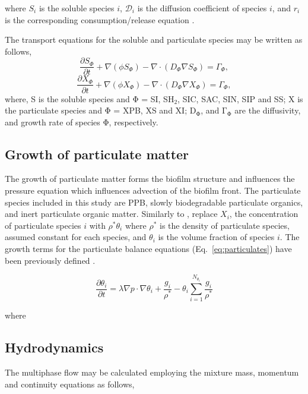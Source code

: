 where $S_i$ is the soluble species $i$, $\mathcal{D}_i$ is the diffusion coefficient of species $i$, and $r_i$ is the corresponding consumption/release equation \cite{Puyol2017}.

The transport equations for the soluble and particulate species may be written as follows,
\begin{equation}
\label{eq:solublesD}
\frac{\partial S_{\Phi}}{\partial t} + \nabla (\phi S_{\Phi}) - \nabla \cdot (D_{\Phi} \nabla S_{\Phi}) = \Gamma_{\Phi}, 
\end{equation}
\begin{equation}
\label{eq:particulate}
\frac{\partial X_{\Phi}}{\partial t} + \nabla (\phi X_{\Phi}) - \nabla \cdot (D_{\Phi} \nabla X_{\Phi}) = \Gamma_{\Phi}, 
\end{equation}
where, S is the soluble species and $\mathrm{\Phi}$ = SI, SH$\mathrm{_2}$, SIC, SAC, SIN, SIP and SS; X is the particulate species and $\mathrm{\Phi}$ = XPB, XS and XI; $\mathrm{D_{\Phi}}$, and $\mathrm{\Gamma_{\Phi}}$ are the diffusivity, and growth rate of species $\mathrm{\Phi}$, respectively.  


\subsection{Growth of particulate matter}
The growth of particulate matter forms the biofilm structure and influences the pressure equation which influences advection of the biofilm front. The particulate species included in this study are PPB, slowly biodegradable particulate organics, and inert particulate organic matter. Similarly to \cite{alpkvist2007}, replace $X_i$, the concentration of particulate species $i$ with $\rho^*\theta_i$ where $\rho^*$ is the density of particulate species, assumed constant for each species, and $\theta_i$ is the volume fraction of species $i$. The growth terms for the particulate balance equations (Eq.~\ref{eq:particulates}) have been previously defined \cite{Puyol2017}.


\begin{equation}
    \label{eq:particulates}
    \frac{\partial \theta_i}{\partial t} = \lambda \nabla p \cdot \nabla \theta_i + \frac{g_i}{\rho^*} - \theta_i \sum_{i=1}^{N_{\theta_i}}\frac{g_i}{\rho^*}
\end{equation}

where 

\subsection{Hydrodynamics}
\label{Hydro}
The multiphase flow may be calculated employing the mixture mass, momentum and continuity equations as follows,


